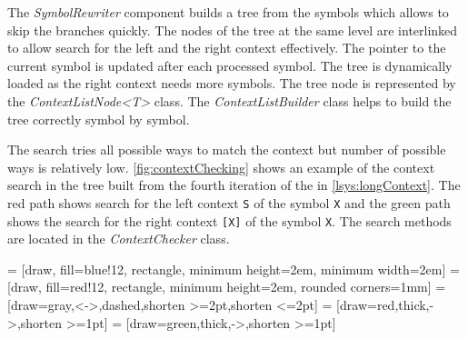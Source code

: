 The \emph{SymbolRewriter} component builds a tree from the symbols which allows to skip the branches quickly.
The nodes of the tree at the same level are interlinked to allow search for the left and the right context effectively.
The pointer to the current symbol is updated after each processed symbol.
The tree is dynamically loaded as the right context needs more symbols.
The tree node is represented by the \emph{ContextListNode<T>} class.
The \emph{ContextListBuilder} class helps to build the tree correctly symbol by symbol.

The search tries all possible ways to match the context but number of possible ways is relatively low.
\autoref{fig:contextChecking} shows an example of the context search in the tree built from the fourth iteration of the \lsystem in \autoref{lsys:longContext}.
The red path shows search for the left context \texttt{S} of the symbol \texttt{X} and the green path shows the search for the right context \texttt{[X]} of the symbol \texttt{X}.
The search methods are located in the \emph{ContextChecker} class.

 = [draw, fill=blue!12, rectangle, minimum height=2em, minimum width=2em]
 = [draw, fill=red!12, rectangle, minimum height=2em, rounded corners=1mm]
 = [draw=gray,<->,dashed,shorten >=2pt,shorten <=2pt]
 = [draw=red,thick,->,shorten >=1pt]
 = [draw=green,thick,->,shorten >=1pt]

